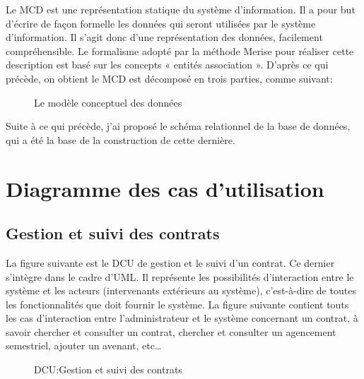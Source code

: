 \documentclass[a4paper]{report}
\begin{document}
\begin{doublespace}
	Le MCD est une représentation statique du système d’information.
	Il a pour but d’écrire de façon formelle les données qui seront utilisées par le système d’information.
	Il s’agit donc d’une représentation des données, facilement compréhensible.
	Le formalisme adopté par la méthode Merise pour réaliser cette description est basé sur les concepts « entités association ».
	D’après ce qui précède, on obtient le MCD est décomposé en trois parties, comme suivant:
	\begin{figure}[H]
		\begin{center}
			\caption{Le modèle conceptuel des données}
		\end{center}
	\end{figure}
	Suite à ce qui précède, j'ai proposé le schéma relationnel de la base de données, qui a été la base de la construction de cette dernière.

	\section{Diagramme des cas d'utilisation}
	\subsection{Gestion et suivi des contrats}

	La figure suivante est le DCU de gestion et le suivi d'un contrat. Ce dernier s’intègre
	dans le cadre d'UML. Il représente les possibilités d'interaction entre le système et les acteurs
	(intervenants extérieurs au système), c'est-à-dire de toutes les fonctionnalités que doit fournir le système.
	La figure suivante contient touts les cas d'interaction entre l'administrateur et le système concernant un contrat,
	à savoir chercher et consulter un contrat, chercher et consulter un agencement semestriel,
	ajouter un avenant, etc\dots
	\begin{figure}[H]
		\begin{center}
			\caption{DCU:Gestion et suivi des contrats}
		\end{center}
	\end{figure}


\end{doublespace}
\end{document}

